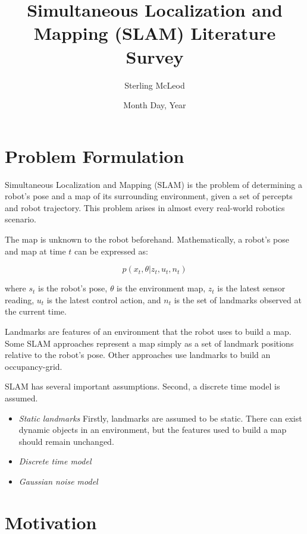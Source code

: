 \documentclass[10pt,conference]{ieeeconf}
\begin{document}
\author{Sterling McLeod}
\title {Simultaneous Localization and Mapping (SLAM) Literature Survey}
\date {Month Day, Year}

\maketitle


\section {Problem Formulation}

    Simultaneous Localization and Mapping (SLAM) is the problem of determining a robot's pose and a map of its surrounding environment, given a set of percepts and robot trajectory. This problem arises in almost every real-world robotics scenario. 
    
    The map is unknown to the robot beforehand. Mathematically, a robot's pose and map at time $t$ can be expressed as:
    
    \begin{equation}
    p(x_t,\theta | z_t, u_t, n_t)
    \end{equation}
    
    where $s_t$ is the robot's pose, $\theta$ is the environment map, $z_t$ is the latest sensor reading, $u_t$ is the latest control action, and $n_t$ is the set of landmarks observed at the current time.
    
    Landmarks are features of an environment that the robot uses to build a map. Some SLAM approaches represent a map simply as a set of landmark positions relative to the robot's pose. Other approaches use landmarks to build an occupancy-grid.
    
    SLAM has several important assumptions. Second, a discrete time model is assumed.
\begin{itemize}
	\item \emph{Static landmarks}
	Firstly, landmarks are assumed to be static. There can exist dynamic objects in an environment, but the features used to build a map should remain unchanged. 

	\item \emph{Discrete time model}
	
	\item \emph{Gaussian noise model}	

		
	
\end{itemize}


\section {Motivation}
\end{document}
